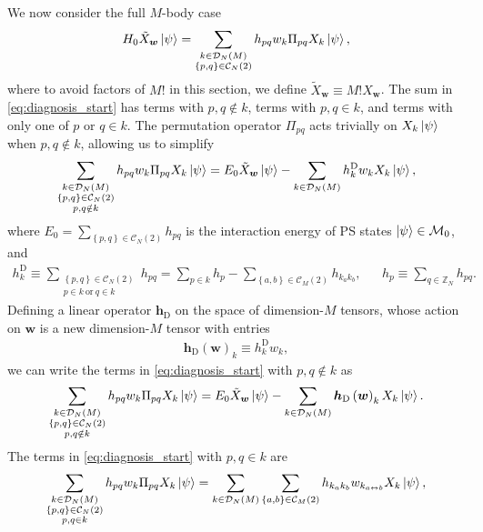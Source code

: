 \documentclass[nofootinbib,notitlepage,11pt]{revtex4-2}
\renewcommand{\t}{\text} %
\newcommand{\p}[1]{\left(#1\right)} %
\renewcommand{\set}[1]{\left\{#1\right\}} %
\newcommand{\m}{\bm} %
\newcommand{\1}{\mathds{1}}
\newcommand{\C}{\mathcal{C}}
\newcommand{\D}{\mathcal{D}}
\newcommand{\M}{\mathcal{M}}
\newcommand{\ZZ}{\mathbb{Z}}
\newcommand{\lra}{\leftrightarrow}
\begin{document}
We now consider the full $M$-body case
\begin{align}
  H_0 \tilde X_{\m w} \ket\psi
  = \sum_{\substack{k\in\D_N\p{M}\\\set{p,q}\in\C_N\p{2}}}
  h_{pq} w_k \Pi_{pq} X_k \ket\psi,
  \label{eq:diagnosis_start}
\end{align}
where to avoid factors of $M!$ in this section, we define
$\tilde X_{\m w}\equiv M! X_{\m w}$.  The sum in
\eqref{eq:diagnosis_start} has terms with $p,q\notin k$, terms with
$p,q\in k$, and terms with only one of $p$ or $q\in k$.  The
permutation operator $\Pi_{pq}$ acts trivially on $X_k\ket\psi$ when
$p,q\notin k$, allowing us to simplify
\begin{align}
  \sum_{\substack{k\in\D_N\p{M}\\\set{p,q}\in\C_N\p{2}\\p,q\notin k}}
  h_{pq} w_k \Pi_{pq} X_k \ket\psi
  = E_0 \tilde X_{\m w} \ket\psi
  - \sum_{k\in\D_N\p{M}} h^{\t{D}}_k w_k X_k \ket\psi,
\end{align}
where $E_0 = \sum_{\set{p,q}\in\C_N\p{2}} h_{pq}$ is the interaction
energy of PS states $\ket\psi\in\M_0$, and
\begin{align}
  h^{\t{D}}_k \equiv
  \sum_{\substack{\set{p,q}\in\C_N\p{2}\\p\in k~\t{or}~q\in k}} h_{pq}
  = \sum_{p\in k} h_p - \sum_{\set{a,b}\in\C_M\p{2}} h_{k_ak_b},
  &&
  h_p \equiv \sum_{q\in\ZZ_N} h_{pq}.
  \label{eq:multi_body_op_diag_element}
\end{align}
Defining a linear operator $\m h_{\t{D}}$ on the space of
dimension-$M$ tensors, whose action on $\m w$ is a new dimension-$M$
tensor with entries
\begin{align}
  \m h_{\t{D}}\p{\m w}_k \equiv h^{\t{D}}_k w_k,
  \label{eq:multi_body_op_diag}
\end{align}
we can write the terms in \eqref{eq:diagnosis_start} with
$p,q\notin k$ as
\begin{align}
  \sum_{\substack{k\in\D_N\p{M}\\\set{p,q}\in\C_N\p{2}\\p,q\notin k}}
  h_{pq} w_k \Pi_{pq} X_k \ket\psi
  = E_0 \tilde X_{\m w} \ket\psi
  - \sum_{k\in\D_N\p{M}} \m h_{\t{D}}\p{\m w}_k X_k \ket\psi.
\end{align}
The terms in \eqref{eq:diagnosis_start} with $p,q\in k$ are
\begin{align}
  \sum_{\substack{k\in\D_N\p{M}\\\set{p,q}\in\C_N\p{2}\\p,q\in k}}
  h_{pq} w_k \Pi_{pq} X_k \ket\psi
  = \sum_{k\in\D_N\p{M}} \sum_{\substack{\set{a,b}\in\C_M\p{2}}}
  h_{k_ak_b} w_{k_{a\lra b}} X_k \ket\psi,
\end{align}
\end{document}
